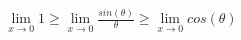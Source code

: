 \documentclass[preview]{standalone}
\begin{document}
\begin{align*}
\lim_{x\to0} 1 \geq \lim_{x\to0} \frac{sin(\theta)}{\theta} \geq \lim_{x\to0} cos(\theta)
\end{align*}
\end{document}
